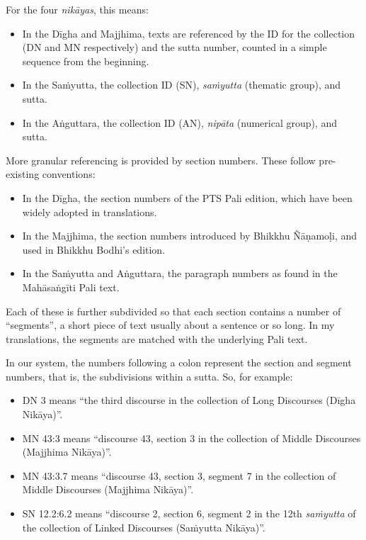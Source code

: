 \documentclass[12pt,openany]{book}%
\begin{document}
For the four \textit{\textsanskrit{nikāyas}}, this means:

\begin{itemize}%
\item In the \textsanskrit{Dīgha} and Majjhima, texts are referenced by the ID for the collection (DN and MN respectively) and the sutta number, counted in a simple sequence from the beginning.%
\item In the \textsanskrit{Saṁyutta}, the collection ID (SN), \textit{\textsanskrit{saṁyutta}} (thematic group), and sutta.%
\item In the \textsanskrit{Aṅguttara}, the collection ID (AN), \textit{\textsanskrit{nipāta}} (numerical group), and sutta.%
\end{itemize}

More granular referencing is provided by section numbers. These follow pre-existing conventions:

\begin{itemize}%
\item In the \textsanskrit{Dīgha}, the section numbers of the PTS Pali edition, which have been widely adopted in translations.%
\item In the Majjhima, the section numbers introduced by Bhikkhu \textsanskrit{Ñāṇamoḷi}, and used in Bhikkhu Bodhi’s edition.%
\item In the \textsanskrit{Saṁyutta} and \textsanskrit{Aṅguttara}, the paragraph numbers as found in the \textsanskrit{Mahāsaṅgīti} Pali text.%
\end{itemize}

Each of these is further subdivided so that each section contains a number of “segments”, a short piece of text usually about a sentence or so long. In my translations, the segments are matched with the underlying Pali text.

In our system, the numbers following a colon represent the section and segment numbers, that is, the subdivisions within a sutta. So, for example:

\begin{itemize}%
\item DN 3 means “the third discourse in the collection of Long Discourses (\textsanskrit{Dīgha} \textsanskrit{Nikāya})”.%
\item MN 43:3 means “discourse 43, section 3 in the collection of Middle Discourses (Majjhima \textsanskrit{Nikāya})”.%
\item MN 43:3.7 means “discourse 43, section 3, segment 7 in the collection of Middle Discourses (Majjhima \textsanskrit{Nikāya})”.%
\item SN 12.2:6.2 means “discourse 2, section 6, segment 2 in the 12th \textit{\textsanskrit{saṁyutta}} of the collection of Linked Discourses (\textsanskrit{Saṁyutta} \textsanskrit{Nikāya})”.%
\end{itemize}
\end{document}
